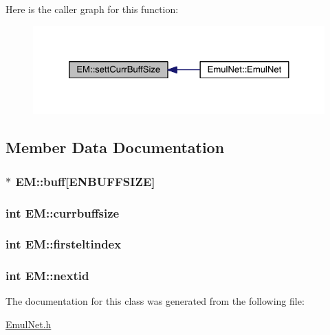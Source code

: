 Here is the caller graph for this function\+:\nopagebreak
\begin{figure}[H]
\begin{center}
\leavevmode
\includegraphics[width=324pt]{db/dfc/class_e_m_a04735702f4943bd77292f2fb8d8b5a7d_icgraph}
\end{center}
\end{figure}




\subsection{Member Data Documentation}
\hypertarget{class_e_m_adf16de55850031c37ec50d40595304e9}{}
\subsubsection[{buff}]{$\ast$ E\+M\+::buff\mbox{[}{\bf E\+N\+B\+U\+F\+F\+S\+I\+Z\+E}\mbox{]}}\label{class_e_m_adf16de55850031c37ec50d40595304e9}
\hypertarget{class_e_m_a8199bc20a63a93126b276a1d968ca72c}{}
\subsubsection[{currbuffsize}]{\setlength{\rightskip}{0pt plus 5cm}int E\+M\+::currbuffsize}\label{class_e_m_a8199bc20a63a93126b276a1d968ca72c}
\hypertarget{class_e_m_a7c7dfed53d8ee4b28b738f8a4dc47424}{}
\subsubsection[{firsteltindex}]{\setlength{\rightskip}{0pt plus 5cm}int E\+M\+::firsteltindex}\label{class_e_m_a7c7dfed53d8ee4b28b738f8a4dc47424}
\hypertarget{class_e_m_abe82d3a166960b6c717b29111e337ada}{}
\subsubsection[{nextid}]{\setlength{\rightskip}{0pt plus 5cm}int E\+M\+::nextid}\label{class_e_m_abe82d3a166960b6c717b29111e337ada}


The documentation for this class was generated from the following file\+:\begin{DoxyCompactItemize}
\item 
\hyperlink{_emul_net_8h}{Emul\+Net.\+h}\end{DoxyCompactItemize}
